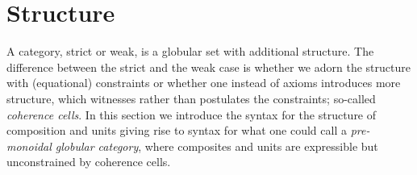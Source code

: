 \section{Structure}
\label{sec:structure}



A category, strict or weak, is a globular set with additional
structure. The difference between the strict and the weak case is whether
we adorn the structure with (equational) constraints or whether one instead
of axioms introduces more structure, which witnesses rather than postulates
the constraints; so-called \emph{coherence cells}. In this section we
introduce the syntax for the structure of composition and units
giving rise to syntax for what one could call a \emph{pre-monoidal
  globular category}, where composites and units are expressible but
unconstrained by coherence cells.

